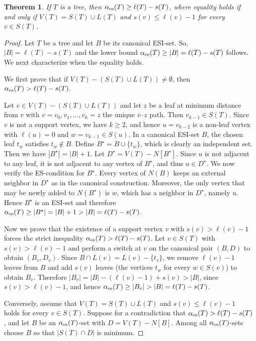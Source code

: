 \documentclass[11pt]{article}
\newtheorem{theorem}{Theorem}
\newcommand{\es}{\alpha_{\rm es}}
\begin{document}
\begin{theorem}
\label{tree-lower}
If $T$ is a tree, then $\es(T)\geq \ell(T)-s(T)$, where equality holds if and only if $V(T)=S(T)\cup L(T)$ and $s(v) \leq \ell(v)-1$ for every $v\in S(T)$.
\end{theorem}

\begin{proof}
Let $T$ be a tree and let $B$ be its canonical ESI-set.  So,  $|B|=\ell(T)-s(T)$ and the lower bound $\es(T)\geq |B|=\ell(T)-s(T)$ follows. 
We next characterize when the equality holds.

We first prove that if $V(T)-(S(T)\cup L(T))\neq \emptyset$, then $\es(T)>\ell(T)-s(T)$.

Let $v\in V(T)-(S(T)\cup L(T))$ and let $z$ be a leaf at minimum distance from $v$ with $v=v_0,v_1,\dots,v_k=z$ the unique $v$--$z$ path. Then $v_{k-1}\in S(T)$. Since $v$ is not a support vertex, we have $k\ge 2$, and hence $u=v_{k-2}$ is a non-leaf vertex with $\ell(u)=0$ and $w=v_{k-1}\in S(u)$. 
In a canonical ESI-set $B$, the chosen leaf $t_w$ satisfies $t_w\notin B$. Define $B^\star=B\cup\{t_w\}$, which is clearly an independent set. Then we have $|B^\star|=|B|+1$. Let $D^\star=V(T)-N[B^\star]$. Since $u$ is not adjacent to any leaf, it is not adjacent to any vertex of $B^\star$, and thus $u\in D^\star$.
We now verify the ES-condition for $B^\star$. Every vertex of $N(B)$ keeps an external neighbor in $D^\star$ as in the canonical construction. Moreover, the only vertex that may be newly added to $N(B^\star)$ is $w$, 
which has a neighbor in $D^\star$, namely $u$. Hence $B^\star$ is an ESI-set and therefore $\es(T)\ge |B^\star|=|B|+1>|B|=\ell(T)-s(T)$.

Now we prove that the existence of a support vertex $v$ with $s(v)>\ell(v)-1$ forces the strict inequality $\es(T)>\ell(T)-s(T)$. Let $v\in S(T)$ with $s(v)>\ell(v)-1$ and perform a switch at $v$ on the canonical pair $(B,D)$ to obtain $(B_v,D_v)$.
Since $B\cap L(v)=L(v)-\{t_v\}$, we remove $\ell(v)-1$ leaves from $B$ and add $s(v)$
leaves (the vertices $t_w$ for every $w\in S(v)$) to obtain $B_v$. Therefore
$|B_v|=|B|-(\ell(v)-1)+s(v) > |B|$, since $s(v)>\ell(v)-1$, 
and hence $\es(T)\ge |B_v|>|B|=\ell(T)-s(T)$. 

Conversely, assume that $V(T)=S(T)\cup L(T)$ and $s(v)\le \ell(v)-1$ holds for every $v\in S(T)$.
Suppose for a contradiction that $\es(T)>\ell(T)-s(T)$, and let $B$ be an $\es(T)$-set with
$D=V(T)-N[B]$. Among all $\es(T)$-sets choose $B$ so that $|S(T)\cap D|$ is minimum.


\end{proof}
\end{document}
